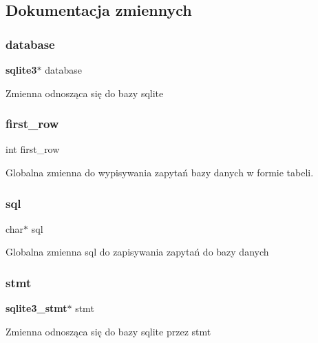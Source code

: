 \subsection{Dokumentacja zmiennych}
\mbox{\label{client__management_8hpp_adebdc4897ddde9329dd87b51840d7ec7}} 
\subsubsection{database}
{\footnotesize\ttfamily \textbf{ sqlite3}$\ast$ database}

Zmienna odnosząca się do bazy sqlite \mbox{\label{client__management_8hpp_a0e2e6fa96fb85ce52ae9d041b24bfda9}} 
\subsubsection{first\_row}
{\footnotesize\ttfamily int first\+\_\+row}

Globalna zmienna do wypisywania zapytań bazy danych w formie tabeli. \mbox{\label{client__management_8hpp_aa29adf0df91c751c5cae685ca18a251f}} 
\subsubsection{sql}
{\footnotesize\ttfamily char$\ast$ sql}

Globalna zmienna sql do zapisywania zapytań do bazy danych \mbox{\label{client__management_8hpp_a38b7f9e3afdf0f12a85d9abb3cd1e195}} 
\subsubsection{stmt}
{\footnotesize\ttfamily \textbf{ sqlite3\+\_\+stmt}$\ast$ stmt}

Zmienna odnosząca się do bazy sqlite przez stmt 